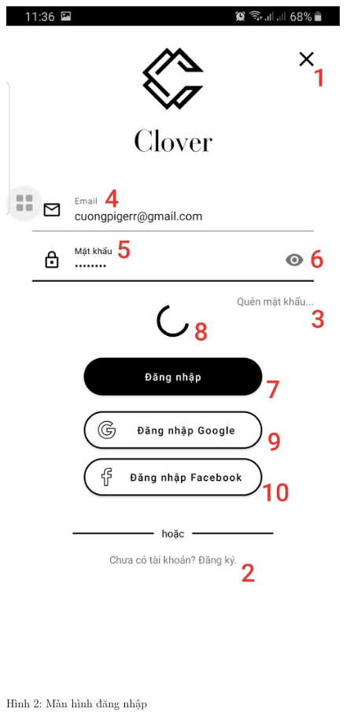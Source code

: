 \documentclass{beamer}
\begin{document}
\begin{frame}
    \begin{columns}
        \begin{figure}
            \centering
            \includegraphics[height=0.7\textheight]{images/02.png}
            \caption{\centering\tiny{Hình 2: Màn hình đăng nhập}}


\end{figure}
\end{columns}
\end{frame}
\end{document}

